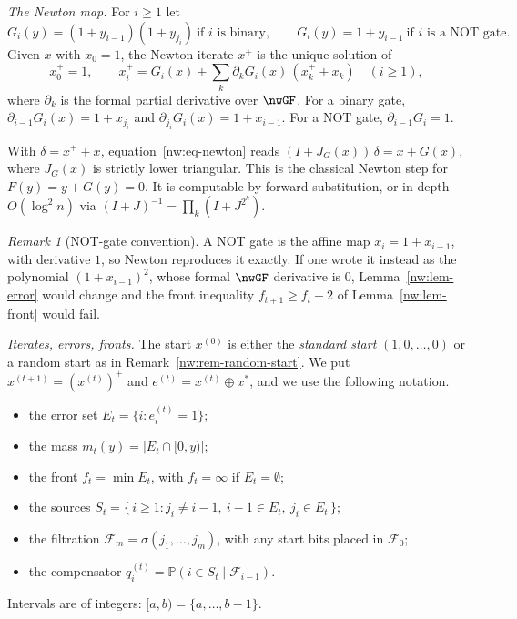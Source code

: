 \documentclass[11pt]{amsart}
\theoremstyle{definition}
\theoremstyle{remark}
\newtheorem{remark}[theorem]{Remark}
\newcommand{\PP}{\mathbb{P}}
\newcommand{\cF}{\mathcal{F}}
\begin{document}
\emph{The Newton map.} For $i\ge1$ let
\[
  G_i(y)=(1+y_{i-1})(1+y_{j_i})\ \text{if $i$ is binary},\qquad
  G_i(y)=1+y_{i-1}\ \text{if $i$ is a NOT gate.}
\]
Given $x$ with $x_0=1$, the Newton iterate $x^+$ is the unique solution of
\begin{equation}\label{nw:eq-newton}
  x^+_0=1,\qquad x^+_i=G_i(x)+\sum_k \partial_k G_i(x)\,(x^+_k+x_k)\quad(i\ge1),
\end{equation}
where $\partial_k$ is the formal partial derivative over $\nwGF$. For a binary
gate, $\partial_{i-1}G_i(x)=1+x_{j_i}$ and $\partial_{j_i}G_i(x)=1+x_{i-1}$.
For a NOT gate, $\partial_{i-1}G_i=1$.

With $\delta=x^++x$, equation~\eqref{nw:eq-newton} reads
$(I+J_G(x))\,\delta=x+G(x)$, where $J_G(x)$ is strictly lower triangular. This
is the classical Newton step for $F(y)=y+G(y)=0$. It is computable by forward
substitution, or in depth $O(\log^2 n)$ via
$(I+J)^{-1}=\prod_k(I+J^{2^k})$.

\begin{remark}[NOT-gate convention]\label{nw:rem-not}
A NOT gate is the affine map $x_i=1+x_{i-1}$, with derivative $1$, so Newton
reproduces it exactly. If one wrote it instead as the polynomial
$(1+x_{i-1})^2$, whose formal $\nwGF$ derivative is $0$,
Lemma~\ref{nw:lem-error} would change and the front inequality
$f_{t+1}\ge f_t+2$ of Lemma~\ref{nw:lem-front} would fail.
\end{remark}

\emph{Iterates, errors, fronts.} The start $x^{(0)}$ is either the
\emph{standard start} $(1,0,\dots,0)$ or a random start as in
Remark~\ref{nw:rem-random-start}. We put $x^{(t+1)}=(x^{(t)})^+$ and
$e^{(t)}=x^{(t)}\oplus x^*$, and we use the following notation.
\begin{itemize}[leftmargin=*]
\item the error set $E_t=\{i:e^{(t)}_i=1\}$;
\item the mass $m_t(y)=|E_t\cap[0,y)|$;
\item the front $f_t=\min E_t$, with $f_t=\infty$ if $E_t=\emptyset$;
\item the sources $S_t=\{\,i\ge1: j_i\ne i-1,\ i-1\in E_t,\ j_i\in E_t\,\}$;
\item the filtration $\cF_m=\sigma(j_1,\dots,j_m)$, with any start bits placed
  in $\cF_0$;
\item the compensator $q^{(t)}_i=\PP(i\in S_t\mid\cF_{i-1})$.
\end{itemize}
Intervals are of integers: $[a,b)=\{a,\dots,b-1\}$.
\end{document}
